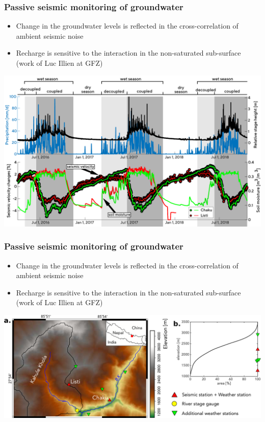 \documentclass[aspectratio=169]{beamer}
\begin{document}
\begin{frame}
    \frametitle{Passive seismic monitoring of groundwater}
    \begin{itemize}
        \item{Change in the groundwater levels is reflected in the cross-correlation of ambient seismic noise}
        \item{Recharge is sensitive to the interaction in the non-saturated sub-surface (work of Luc Illien at GFZ)}
    \end{itemize}
    \centering
    \includegraphics[height=0.5\paperheight]{./figures/illien-figure2.png}
\end{frame}

\begin{frame}
    \frametitle{Passive seismic monitoring of groundwater}
    \begin{itemize}
        \item{Change in the groundwater levels is reflected in the cross-correlation of ambient seismic noise}
        \item{Recharge is sensitive to the interaction in the non-saturated sub-surface (work of Luc Illien at GFZ)}
    \end{itemize}
    \centering
    \includegraphics[height=0.5\paperheight]{./figures/illien-figure.png}
\end{frame}
\end{document}

